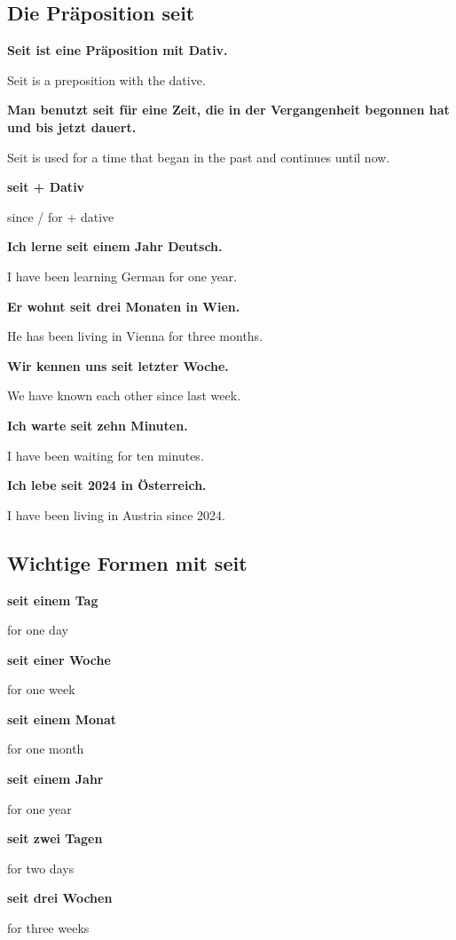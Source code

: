 \documentclass[a4paper]{article}
\newcommand{\EN}[1]{\par{\small\textcolor{TranslationGray}{#1}}\vspace{0.4em}}
\begin{document}
        \subsection{Die Präposition seit}
            
            \textbf{Seit ist eine Präposition mit Dativ.}
            \EN{Seit is a preposition with the dative.}
            
            \textbf{Man benutzt seit für eine Zeit, die in der Vergangenheit begonnen hat und bis jetzt dauert.}
            \EN{Seit is used for a time that began in the past and continues until now.}
            
            \textbf{seit + Dativ}
            \EN{since / for + dative}
            
            \textbf{Ich lerne seit einem Jahr Deutsch.}
            \EN{I have been learning German for one year.}
            
            \textbf{Er wohnt seit drei Monaten in Wien.}
            \EN{He has been living in Vienna for three months.}
            
            \textbf{Wir kennen uns seit letzter Woche.}
            \EN{We have known each other since last week.}
            
            \textbf{Ich warte seit zehn Minuten.}
            \EN{I have been waiting for ten minutes.}
            
            \textbf{Ich lebe seit 2024 in Österreich.}
            \EN{I have been living in Austria since 2024.}
        
        \subsection{Wichtige Formen mit seit}
            
            \textbf{seit einem Tag}
            \EN{for one day}
            
            \textbf{seit einer Woche}
            \EN{for one week}
            
            \textbf{seit einem Monat}
            \EN{for one month}
            
            \textbf{seit einem Jahr}
            \EN{for one year}
            
            \textbf{seit zwei Tagen}
            \EN{for two days}
            
            \textbf{seit drei Wochen}
            \EN{for three weeks}
            
\end{document}
